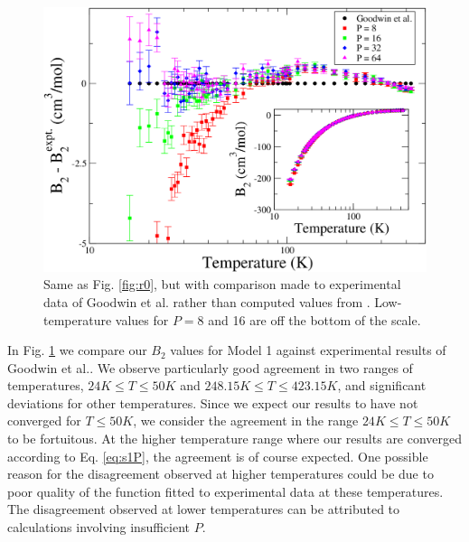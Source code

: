                 \begin{figure}[!htbp]
                    \centering
                    \includegraphics[scale=0.20,keepaspectratio]{Chapter-4/Figures/s1GoodwinAll.png}
                    \caption{Same as Fig. \ref{fig:r0}, but with comparison made to experimental data of Goodwin et al.\cite{Goodwin1963} rather than computed values from \cite{Garberoglio2014}. Low-temperature values for $P = 8$ and 16 are off the bottom of the scale.}
                    \label{fig:r0Goodwin}
                \end{figure}
                In Fig. \ref{fig:r0Goodwin} we compare our $B_2$ values for Model 1 against experimental results of Goodwin et al.\cite{Goodwin1963}. We observe particularly good agreement in two ranges of temperatures, $24 K \le T \le 50 K$ and $ 248.15 K \le T \le 423.15 K$, and significant deviations for other temperatures. Since we expect our results to have not converged for $T \le 50 K$, we consider the agreement in the range $24 K \le T \le 50 K$ to be fortuitous. At the higher temperature range where our results are converged according to Eq. \eqref{eq:s1P}, the agreement is of course expected. One possible reason for the disagreement observed at higher temperatures could be due to poor quality of the function fitted to experimental data at these temperatures. The disagreement observed at lower temperatures can be attributed to calculations involving insufficient $P$.

